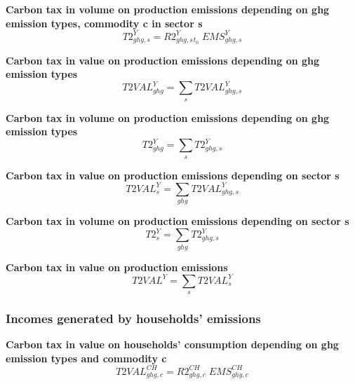\documentclass[12pt]{article}
\numberwithin{equation}{section}
\begin{document}
\noindent \textbf{Carbon tax in volume on production emissions depending on ghg emission types, commodity c in sector s} 
\begin{dmath}
T2^{Y}_{ghg, s} = R2^{Y}_{ghg, s}_{t_0} \; EMS^{Y}_{ghg, s}
\label{Exception_taxes_prices.mdlT2_Y[ghg,s]}
\end{dmath}

\noindent \textbf{Carbon tax in value on production emissions depending on ghg emission types} 
\begin{dmath}
T2VAL^{Y}_{ghg} = \sum_{s} T2VAL^{Y}_{ghg, s}
\label{Exception_taxes_prices.mdlT2VAL_Y[ghg]}
\end{dmath}

\noindent \textbf{Carbon tax in volume on production emissions depending on ghg emission types} 
\begin{dmath}
T2^{Y}_{ghg} = \sum_{s} T2^{Y}_{ghg, s}
\label{Exception_taxes_prices.mdlT2_Y[ghg]}
\end{dmath}

\noindent \textbf{Carbon tax in value on production emissions depending on sector s} 
\begin{dmath}
T2VAL^{Y}_{s} = \sum_{ghg} T2VAL^{Y}_{ghg, s}
\label{Exception_taxes_prices.mdlT2VAL_Y[s]}
\end{dmath}

\noindent \textbf{Carbon tax in volume on production emissions depending on sector s} 
\begin{dmath}
T2^{Y}_{s} = \sum_{ghg} T2^{Y}_{ghg, s}
\label{Exception_taxes_prices.mdlT2_Y[s]}
\end{dmath}

\noindent \textbf{Carbon tax in value on production emissions} 
\begin{dmath}
T2VAL^{Y} = \sum_{s} T2VAL^{Y}_{s}
\label{Exception_taxes_prices.mdlT2VAL_Y}
\end{dmath}



\subsubsection{Incomes generated by households' emissions}



\noindent \textbf{Carbon tax in value on households' consumption depending on ghg emission types and commodity c} 
\begin{dmath}
T2VAL^{CH}_{ghg, c} = R2^{CH}_{ghg, c} \; EMS^{CH}_{ghg, c}
\label{Exception_taxes_prices.mdlT2VAL_CH[ghg,c]}
\end{dmath}
\end{document}
